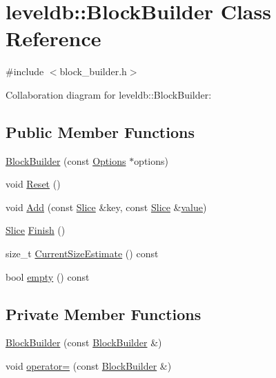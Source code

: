 \hypertarget{classleveldb_1_1_block_builder}{\section{leveldb\-:\-:Block\-Builder Class Reference}
\label{classleveldb_1_1_block_builder}
}


{\ttfamily \#include $<$block\-\_\-builder.\-h$>$}



Collaboration diagram for leveldb\-:\-:Block\-Builder\-:
\subsection*{Public Member Functions}
\begin{DoxyCompactItemize}
\item 
\hyperlink{classleveldb_1_1_block_builder_a697ffa03ff6e8f5dec0558c05136f89c}{Block\-Builder} (const \hyperlink{structleveldb_1_1_options}{Options} $\ast$options)
\item 
void \hyperlink{classleveldb_1_1_block_builder_a812168608c24de2dfa1651fcdd88e49b}{Reset} ()
\item 
void \hyperlink{classleveldb_1_1_block_builder_a17d0e23f1e7afcb874b22a0cb0b6cf17}{Add} (const \hyperlink{classleveldb_1_1_slice}{Slice} \&key, const \hyperlink{classleveldb_1_1_slice}{Slice} \&\hyperlink{cache_8cc_a0f61d63b009d0880a89c843bd50d8d76}{value})
\item 
\hyperlink{classleveldb_1_1_slice}{Slice} \hyperlink{classleveldb_1_1_block_builder_ab345ab44def13fb180502e9637b28bcd}{Finish} ()
\item 
size\-\_\-t \hyperlink{classleveldb_1_1_block_builder_a836fd5dfd46b72d2438a7d59a984a72f}{Current\-Size\-Estimate} () const 
\item 
bool \hyperlink{classleveldb_1_1_block_builder_ae8d2223984da12b810124688aa56fdcd}{empty} () const 
\end{DoxyCompactItemize}
\subsection*{Private Member Functions}
\begin{DoxyCompactItemize}
\item 
\hyperlink{classleveldb_1_1_block_builder_a4b15244785d500c55c34b51ec0553c0d}{Block\-Builder} (const \hyperlink{classleveldb_1_1_block_builder}{Block\-Builder} \&)
\item 
void \hyperlink{classleveldb_1_1_block_builder_a8819087efd18557a877e0dbda3a4c7e6}{operator=} (const \hyperlink{classleveldb_1_1_block_builder}{Block\-Builder} \&)
\end{DoxyCompactItemize}
